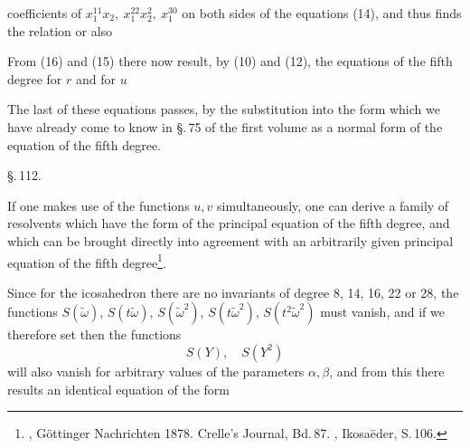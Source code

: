 
coefficients of $x_1^{11}x_2,\ x_1^{22}x_2^2,\ x_1^{30}$ on both sides of the equations (14), and thus finds the relation
or also

From (16) and (15) there now result, by (10) and (12), the equations of the fifth degree for $r$ and for $u$

The last of these equations passes, by the substitution
into the form
which we have already come to know in \S.\,75 of the first volume as a normal form of the equation of the fifth degree.

\begin{center}
\S.\,112.\\[4pt]
\end{center}

If one makes use of the functions $u, v$ simultaneously, one can derive a family of resolvents which have the form of the principal equation of the fifth degree, and which can be brought directly into agreement with an arbitrarily given principal equation of the fifth degree\footnote{, G\"ottinger Nachrichten 1878. Crelle's Journal, Bd.\,87. , Ikosa\"eder, S.\,106.}.

Since for the icosahedron there are no invariants of degree 8, 14, 16, 22 or 28, the functions $S(\tilde\omega)$, $S(t\tilde\omega)$, $S(\tilde\omega^2)$, $S(t\tilde\omega^2)$, $S(t^2\tilde\omega^2)$ must vanish, and if we therefore set
then the functions
\[ S(Y),\quad S(Y^2) \]
will also vanish for arbitrary values of the parameters $\alpha, \beta$, and from this there results an identical equation of the form
